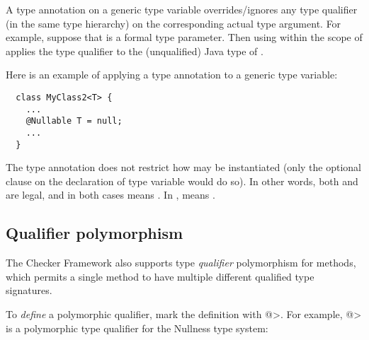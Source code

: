 A type annotation on a generic type variable overrides/ignores any type
qualifier (in the same type hierarchy) on the corresponding actual type
argument.  For example, suppose that  is a formal type parameter.
Then using  within the scope of  applies the type
qualifier  to the (unqualified) Java type of .

Here is an example of applying a type annotation to a generic type
variable:

\begin{Verbatim}
  class MyClass2<T> {
    ...
    @Nullable T = null;
    ...
  }
\end{Verbatim}

\noindent
The type annotation does not restrict how  may be instantiated
(only the optional  clause on the declaration of type
variable  would do so).  In other words, both
 and  are
legal, and in both cases  means .
In ,
 means .





\subsection{Qualifier polymorphism\label{qualifier-polymorphism}}

The Checker Framework also supports type \emph{qualifier} polymorphism for
methods, which permits a single method to have multiple different qualified
type signatures.

To \emph{define} a polymorphic qualifier, mark the definition with
\<@>.  For example,
\<@> is a polymorphic type
qualifier for the Nullness type system:


